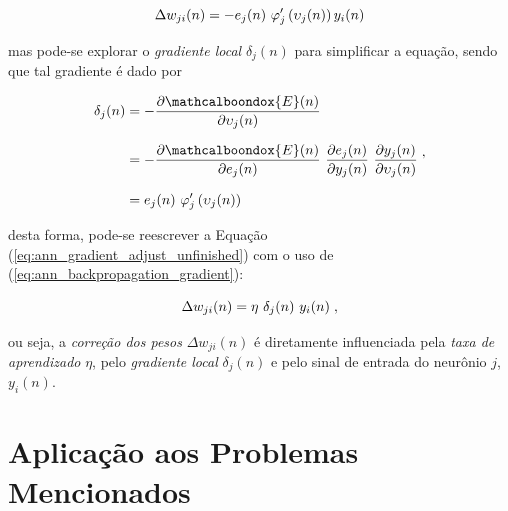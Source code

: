 \begin{equation}
    \Delta w_{ji}(n) = -e_{j}(n)\ \varphi_{j}'\left(\upsilon_{j}(n)\right) y_{i}(n)
    \label{eq:ann_gradient_adjust_unfinished}
    \vspace{0.2cm}
\end{equation}

\noindent mas pode-se explorar o \textit{gradiente local} $\delta_{j}(n)$ para simplificar a equação, sendo que tal gradiente é dado por

\begin{equation}
    \setlength{\jot}{10pt}
    \begin{align}
    \delta_{j}(n)   & = - \dfrac{\partial \mathcalboondox{E}(n)}{\partial \upsilon_{j}(n)}\\
                    & = - \dfrac{\partial \mathcalboondox{E}(n)}{\partial e_{j}(n)}\ \dfrac{\partial e_{j}(n)}{\partial y_{j}(n)}\ \dfrac{\partial y_{j}(n)}{\partial \upsilon_{j}(n)}\\
                    & = e_{j}(n)\ \varphi_{j}'\left(\upsilon_{j}(n)\right)
    \end{align}
    \label{eq:ann_backpropagation_gradient}
    \hspace{0.1cm},
    \vspace{0.2cm}
\end{equation}

\noindent desta forma, pode-se reescrever a Equação (\ref{eq:ann_gradient_adjust_unfinished}) com o uso de (\ref{eq:ann_backpropagation_gradient}):

\begin{equation}
    \Delta w_{ji}(n) = \eta\ \delta_{j}(n)\ y_{i}(n)
    \label{eq:ann_gradient_adjust}
    \hspace{0.1cm},
    \vspace{0.2cm}
\end{equation}

\noindent ou seja, a \textit{correção dos pesos} $\Delta w_{ji}(n)$ é diretamente influenciada pela \textit{taxa de aprendizado} $\eta$, pelo \textit{gradiente local} $\delta_{j}(n)$ e pelo sinal de entrada do neurônio $j$, $y_{i}(n)$. 


\section{Aplicação aos Problemas Mencionados}
\label{sec:ann_application_mentioned_problem}

